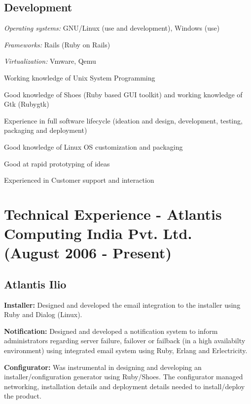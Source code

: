 \documentclass[a4paper,11pt]{article}
\begin{document}
\subsection{Development}
\begin{itemize}
\footnotesize{
  \item[\footnotesize$\bullet$] \textsl{Operating systems:} GNU/Linux (use and development),
    Windows (use)
  \item[\footnotesize$\bullet$] \textsl{Frameworks:} Rails (Ruby on Rails)
  \item[\footnotesize$\bullet$] \textsl{Virtualization:} Vmware, Qemu
  \item[\footnotesize$\bullet$] Working knowledge of Unix System Programming
  \item[\footnotesize$\bullet$] Good knowledge of Shoes (Ruby based GUI toolkit) and working
    knowledge of Gtk (Rubygtk)
  \item[\footnotesize$\bullet$] Experience in full software lifecycle (ideation and design,
 development, testing, packaging and deployment)
  \item[\footnotesize$\bullet$] Good knowledge of Linux OS customization and packaging
  \item[\footnotesize$\bullet$] Good at rapid prototyping of ideas
  \item[\footnotesize$\bullet$] Experienced in Customer support and
    interaction
}
\end{itemize}

\section{Technical Experience - Atlantis Computing India
  Pvt. Ltd. (August 2006 - Present)}

\subsection{Atlantis Ilio}
\begin{itemize}
\footnotesize{
  \item[\footnotesize$\bullet$] \textbf{Installer: } Designed and developed the email
    integration to the installer using Ruby and Dialog (Linux).
  \item[\footnotesize$\bullet$] \textbf{Notification: } Designed and developed a
    notification system to inform administrators regarding server
    failure, failover or failback (in a high availabilty environment) using
    integrated email system using Ruby, Erlang and Erlectricity.
  \item[\footnotesize$\bullet$] \textbf{Configurator: }Was instrumental in
    designing and developing an installer/configuration generator
    using Ruby/Shoes. The configurator managed networking,
    installation details and deployment details needed to
    install/deploy the product.
}
\end{itemize}
\end{document}
